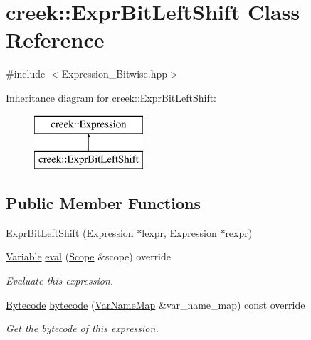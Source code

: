 \hypertarget{classcreek_1_1_expr_bit_left_shift}{}\section{creek\+:\+:Expr\+Bit\+Left\+Shift Class Reference}
\label{classcreek_1_1_expr_bit_left_shift}


{\ttfamily \#include $<$Expression\+\_\+\+Bitwise.\+hpp$>$}

Inheritance diagram for creek\+:\+:Expr\+Bit\+Left\+Shift\+:\begin{figure}[H]
\begin{center}
\leavevmode
\includegraphics[height=2.000000cm]{classcreek_1_1_expr_bit_left_shift}
\end{center}
\end{figure}
\subsection*{Public Member Functions}
\begin{DoxyCompactItemize}
\item 
\hyperlink{classcreek_1_1_expr_bit_left_shift_a0348ad0309236b51efba40559c1e9e73}{Expr\+Bit\+Left\+Shift} (\hyperlink{classcreek_1_1_expression}{Expression} $\ast$lexpr, \hyperlink{classcreek_1_1_expression}{Expression} $\ast$rexpr)
\item 
\hyperlink{classcreek_1_1_variable}{Variable} \hyperlink{classcreek_1_1_expr_bit_left_shift_a77a8a9cb038e025d0627e94b8d8ec9f0}{eval} (\hyperlink{classcreek_1_1_scope}{Scope} \&scope) override
\begin{DoxyCompactList}\small\item\em Evaluate this expression. \end{DoxyCompactList}\item 
\hyperlink{classcreek_1_1_bytecode}{Bytecode} \hyperlink{classcreek_1_1_expr_bit_left_shift_ae2874baa99a31419cd8c60aa5a51dfda}{bytecode} (\hyperlink{classcreek_1_1_var_name_map}{Var\+Name\+Map} \&var\+\_\+name\+\_\+map) const  override\hypertarget{classcreek_1_1_expr_bit_left_shift_ae2874baa99a31419cd8c60aa5a51dfda}{}\label{classcreek_1_1_expr_bit_left_shift_ae2874baa99a31419cd8c60aa5a51dfda}

\begin{DoxyCompactList}\small\item\em Get the bytecode of this expression. \end{DoxyCompactList}\end{DoxyCompactItemize}


